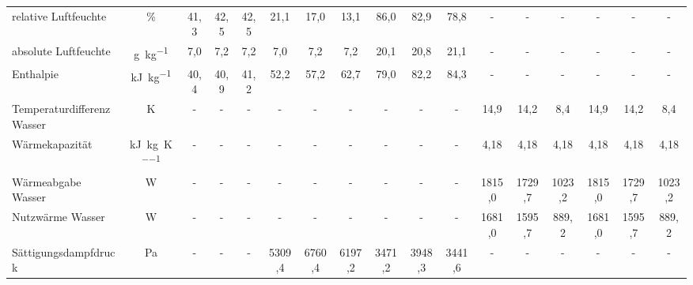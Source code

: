 \begin{landscape}
\begin{table}[h!]
{\begin{tabular}{l|c|c|c|c|c|c|c|c|c|c|c|c|c|c|c|c}
				relative Luftfeuchte & \%    & \multicolumn{1}{c|}{41,3} & \multicolumn{1}{c|}{42,5} &
				\multicolumn{1}{c|}{42,5} 
				& 21,1  & 17,0  & 13,1
				& 86,0  & 82,9  & 78,8  & -     & -     & -     & -     & -     & - \\
				absolute Luftfeuchte & \si{\gram \per \kg}  
				& \multicolumn{1}{c|}{7,0} & \multicolumn{1}{c|}{7,2} & \multicolumn{1}{c|}{7,2} 
				& 7,0   & 7,2   & 7,2
				& 20,1 & 20,8  & 21,1 & -     & -     & -     & -     & -     & - \\
				Enthalpie & \si{\kilo \joule \per \kg} & \multicolumn{1}{c|}{40,4} & \multicolumn{1}{c|}{40,9} & \multicolumn{1}{c|}{41,2} 
				& 52,2  & 57,2 & 62,7
				& 79,0  & 82,2 & 84,3  & -     & -     & -     & -     & -     & - \\
				\hline
				Temperaturdifferenz  Wasser & K     & -     & -     & -     & \multicolumn{1}{c|}{-} & \multicolumn{1}{c|}{-} & \multicolumn{1}{c|}{-} & \multicolumn{1}{c|}{-} & \multicolumn{1}{c|}{-} & \multicolumn{1}{c|}{-} 
				& \multicolumn{1}{c|}{14,9} & \multicolumn{1}{c|}{14,2} & \multicolumn{1}{c|}{8,4}
				& \multicolumn{1}{c|}{14,9} & 14,2   & 8,4 \\
				Wärmekapazität & \si{\kilo \joule \per \kg \per \kelvin} & -     & -     & -     & \multicolumn{1}{c|}{-} & \multicolumn{1}{c|}{-} & \multicolumn{1}{c|}{-} & \multicolumn{1}{c|}{-} & \multicolumn{1}{c|}{-} & \multicolumn{1}{c|}{-}
				& \multicolumn{1}{c|}{4,18} & \multicolumn{1}{c|}{4,18} & \multicolumn{1}{c|}{4,18} & \multicolumn{1}{c|}{4,18} & 4,18  & 4,18 \\
				Wärmeabgabe Wasser & W     & -     & -     & -     & \multicolumn{1}{c|}{-} & \multicolumn{1}{c|}{-} & \multicolumn{1}{c|}{-} & \multicolumn{1}{c|}{-} & \multicolumn{1}{c|}{-} & \multicolumn{1}{c|}{-} & \multicolumn{1}{c|}{1815,0} & \multicolumn{1}{c|}{1729,7} & \multicolumn{1}{c|}{1023,2} & \multicolumn{1}{c|}{1815,0} & 1729,7 & 1023,2 \\
				Nutzwärme Wasser & W     & -     & -     & -     & \multicolumn{1}{c|}{-} & \multicolumn{1}{c|}{-} & \multicolumn{1}{c|}{-} & \multicolumn{1}{c|}{-} & \multicolumn{1}{c|}{-} & \multicolumn{1}{c|}{-} & \multicolumn{1}{c|}{1681,0} & \multicolumn{1}{c|}{1595,7} & \multicolumn{1}{c|}{889,2} & \multicolumn{1}{c|}{1681,0} & 1595,7 & 889,2 \\
				\hline
				Sättigungsdampfdruck & Pa    & -     & -     & -     & 5309,4 & 6760,4 & 6197,2 & 3471,2 & 3948,3 & 3441,6 & -     & -     & -     & -     & -     & - \\

\end{tabular}}
\end{table}
\end{landscape}
